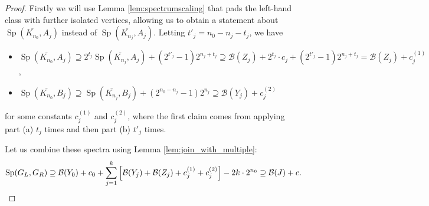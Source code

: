 \documentclass[10pt,a4paper]{amsart}
\DeclareMathOperator{\Sp}{Sp}
\newcommand{\cB}{\mathcal{B}}
\begin{document}
\begin{proof}
 Firstly we will use Lemma \ref{lem:spectrumscaling} that pads the left-hand class with further isolated vertices, allowing us to obtain a statement about $\Sp(\overline{K_{n_0}}, A_j)$ instead of $\Sp(\overline{K_{n_j}}, A_j)$. Letting $t'_j=n_0-n_j-t_j$, we have
 \begin{itemize}
 \itemsep0em
 \item $\Sp(\overline{K_{n_0}}, A_j)\supseteq 2^{t_j} \Sp(\overline{K_{n_j}}, A_j) + (2^{t'_j}-1)2^{n_j+t_j}\supseteq \cB(Z_j)+2^{t_j}\cdot c_j+(2^{t'_j}-1) 2^{n_j+t_j}=\cB(Z_j)+c^{(1)}_j$,
 \item $\Sp(\overline{K_{n_0}}, B_j)\supseteq \Sp(\overline{K_{n_j}}, B_j) + (2^{n_0-n_j}-1)2^{n_j}\supseteq \cB(Y_j)+c^{(2)}_j$
 \end{itemize}

 for some constants $c^{(1)}_j$ and $c^{(2)}_j$, where the first claim comes from applying part (a) $t_j$ times and then part (b) $t'_j$ times.

 Let us combine these spectra using Lemma \ref{lem:join_with_multiple}:
 \begin{equation*}
 \Sp(G_L, G_R)\supseteq \cB(Y_0) + c_0 + \sum_{j=1}^k \left[\cB(Y_j) + \cB(Z_j) + c_j^{(1)} + c_j^{(2)} \right] - 2k\cdot 2^{n_0}\supseteq \cB(J)+c. \qedhere
 \end{equation*}
\end{proof}
\end{document}
